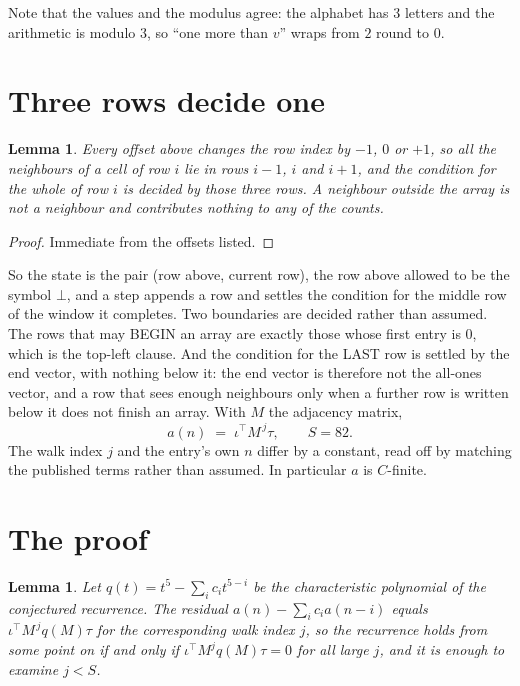 \documentclass[11pt,a4paper]{article}
\theoremstyle{plain}
\newtheorem{lemma}[theorem]{Lemma}
\theoremstyle{definition}
\begin{document}
Note that the values and the modulus agree: the alphabet has $3$ letters and the arithmetic
is modulo $3$, so ``one more than $v$'' wraps from $2$ round to $0$.

\section{Three rows decide one}

\begin{lemma}\label{lem:win}
Every offset above changes the row index by $-1$, $0$ or $+1$, so all the neighbours of a cell
of row $i$ lie in rows $i-1$, $i$ and $i+1$, and the condition for the whole of row $i$ is
decided by those three rows. A neighbour outside the array is not a neighbour and contributes
nothing to any of the counts.
\end{lemma}

\begin{proof}
Immediate from the offsets listed.
\end{proof}

So the state is the pair (row above, current row), the row above allowed to be the symbol
$\bot$, and a step appends a row and settles the condition for the middle row of the window it
completes. Two boundaries are decided rather than assumed. The rows that may BEGIN an array are
exactly those whose first entry is $0$, which is the top-left clause. And the condition for the
LAST row is settled by the end vector, with nothing below it: the end vector is therefore not
the all-ones vector, and a row that sees enough neighbours only when a further row is written
below it does not finish an array. With $M$ the adjacency matrix,
\[
a(n)\;=\;\iota^{\!\top}M^{\,j}\tau ,\qquad S=82.
\]
The walk index $j$ and the entry's own $n$ differ by a constant, read off by matching the
published terms rather than assumed. In particular $a$ is $C$-finite.

\section{The proof}

\begin{lemma}\label{lem:crit}
Let $q(t)=t^{5}-\sum_i c_it^{5-i}$ be the characteristic polynomial of the
conjectured recurrence. The residual $a(n)-\sum_ic_ia(n-i)$ equals
$\iota^{\!\top}M^{\,j}q(M)\tau$ for the corresponding walk index $j$, so the recurrence
holds from some point on if and only if $\iota^{\!\top}M^{j}q(M)\tau=0$ for all large $j$,
and it is enough to examine $j<S$.
\end{lemma}
\end{document}
